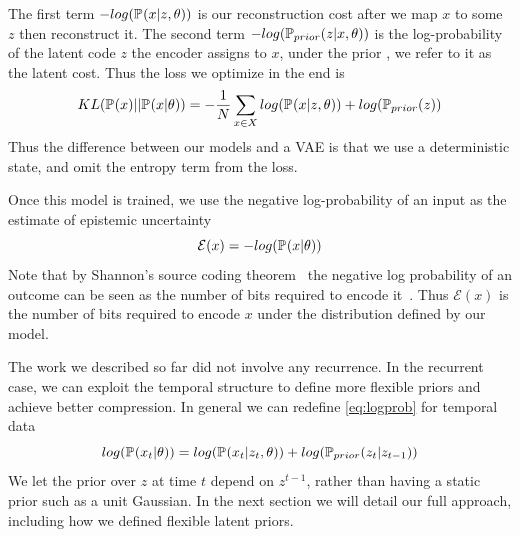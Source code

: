 \documentclass[../main.tex]{subfiles}
\begin{document}
The first term $-log(\pdf{x|z,\theta})$ is our reconstruction cost after we map $x$ to some $z$ then reconstruct it. The second term $-log(\pdf[prior]{z|x,\theta})$ is the log-probability of the latent code $z$ the encoder assigns to $x$, under the prior , we refer to it as the latent cost. 
Thus the loss we optimize in the end is 
\begin{equation}
        KL(\pdf[]{x} || \pdf{x|\theta}) = - \frac{1}{N} \sum_{x \in X} log(\pdf{x|z,\theta}) + log(\pdf[prior]{z})
\end{equation}{}
Thus the difference between our models and a VAE is that we use a deterministic state, and omit the entropy term from the loss. 

Once this model is trained, we use the negative log-probability of an input as the estimate of epistemic uncertainty
\begin{equation}
    \mathcal{E}(x) = -log(\pdf{x|\theta})
\end{equation}{}
Note that by Shannon's source coding theorem~\citep{shannon1948mathematical} the negative log probability of an outcome can be seen as the number of bits required to encode it~\citep{hinton1994autoencoders}. Thus $\mathcal{E}(x)$ is  the number of bits required to encode $x$ under the distribution defined by our model. 

The work we described so far did not involve any recurrence. In the recurrent case, we can exploit the temporal structure to define more flexible priors and achieve better compression. In general we can redefine \cref{eq:logprob} for temporal data 
\begin{equation}
    \label{eq:temporal_logprob}
    log(\pdf{x_t|\theta}) = log(\pdf{x_t|z_t,\theta}) + log(\pdf[prior]{z_t|z_{t-1}})
\end{equation}{}
We let the prior over $z$ at time $t$ depend on $z^{t-1}$, rather than having a static prior such as a unit Gaussian. In the next section we will detail our full approach, including how we defined flexible latent priors. 



\end{document}
